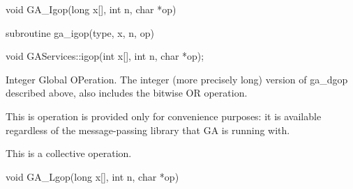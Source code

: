 \documentclass[12pt]{article}
\begin{document}

\begin{capi}
\begin{ccode}
void GA_Igop(long x[], int n, char *op)
\end{ccode}
\begin{funcargs}
\end{funcargs}
\end{capi}

\begin{fapi}
\begin{fcode}
subroutine ga_igop(type, x, n, op)
\end{fcode}
\begin{funcargs}
\end{funcargs}
\end{fapi}

\begin{cxxapi}
\begin{cxxcode}
void GAServices::igop(int x[], int n, char *op);
\end{cxxcode}
\begin{funcargs}
\end{funcargs}
\end{cxxapi}
\wcoll
\begin{desc}

Integer Global OPeration. The integer (more precisely long) version
of ga_dgop described above, also includes the bitwise OR operation.

This is operation is provided only for convenience purposes: it is
available regardless of the message-passing library that GA is running with.

This is a collective operation.
\end{desc}


\begin{capi}
\begin{ccode}
void GA_Lgop(long x[], int n, char *op)
\end{ccode}
\begin{funcargs}
\end{funcargs}
\end{capi}
\end{document}
